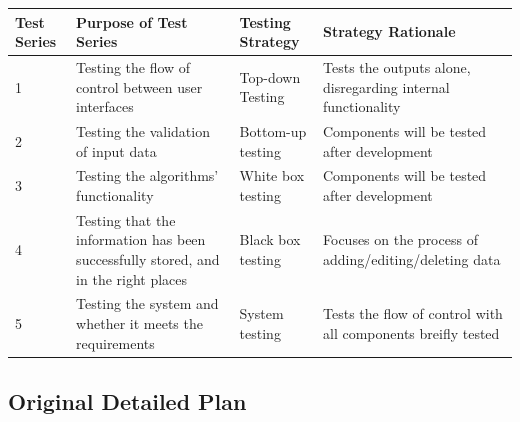 \begin{landscape}
\begin{center}
    \begin{tabular}{|p{2cm}|p{5cm}|p{5cm}|p{4cm}|}
        \hline
        \textbf{Test Series} & \textbf{Purpose of Test Series} & \textbf{Testing Strategy} & \textbf{Strategy Rationale}\\ \hline 
        1 & Testing the flow of control between user interfaces & Top-down Testing & Tests the outputs alone, disregarding internal functionality \\ \hline
        2 & Testing the validation of input data & Bottom-up testing & Components will be tested after development \\ \hline
        3 & Testing the algorithms' functionality & White box testing & Components will be tested after development \\ \hline
        4 & Testing that the information has been successfully stored, and in the right places & Black box testing & Focuses on the process of adding/editing/deleting data \\ \hline
        5 & Testing the system and whether it meets the requirements & System testing & Tests the flow of control with all components breifly tested \\ \hline
    \end{tabular}
\end{center}

\subsection{Original Detailed Plan}



\end{landscape}
